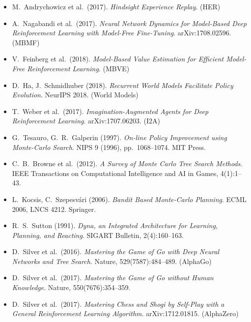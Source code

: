 \documentclass[11pt,a4paper]{article}
\theoremstyle{definition}
\theoremstyle{plain}
\theoremstyle{remark}
\begin{document}
\begin{itemize}
    \item M.\ Andrychowicz et al.\ (2017). \emph{Hindsight Experience Replay}. (HER)
    \item A.\ Nagabandi et al.\ (2017). \emph{Neural Network Dynamics for Model-Based Deep Reinforcement Learning with Model-Free Fine-Tuning}. arXiv:1708.02596. (MBMF)
    \item V.\ Feinberg et al.\ (2018). \emph{Model-Based Value Estimation for Efficient Model-Free Reinforcement Learning}. (MBVE)
    \item D.\ Ha, J.\ Schmidhuber (2018). \emph{Recurrent World Models Facilitate Policy Evolution}. NeurIPS 2018. (World Models)
    \item T.\ Weber et al.\ (2017). \emph{Imagination-Augmented Agents for Deep Reinforcement Learning}. arXiv:1707.06203. (I2A)
    \item G.\ Tesauro, G.\ R.\ Galperin (1997). \emph{On-line Policy Improvement using Monte-Carlo Search}. NIPS 9 (1996), pp.\ 1068--1074. MIT Press.
    \item C.\ B.\ Browne et al.\ (2012). \emph{A Survey of Monte Carlo Tree Search Methods}. IEEE Transactions on Computational Intelligence and AI in Games, 4(1):1--43.
    \item L.\ Kocsis, C.\ Szepesv\'ari (2006). \emph{Bandit Based Monte-Carlo Planning}. ECML 2006, LNCS 4212. Springer.
    \item R.\ S.\ Sutton (1991). \emph{Dyna, an Integrated Architecture for Learning, Planning, and Reacting}. SIGART Bulletin, 2(4):160--163.
    \item D.\ Silver et al.\ (2016). \emph{Mastering the Game of Go with Deep Neural Networks and Tree Search}. Nature, 529(7587):484--489. (AlphaGo)
    \item D.\ Silver et al.\ (2017). \emph{Mastering the Game of Go without Human Knowledge}. Nature, 550(7676):354--359.
    \item D.\ Silver et al.\ (2017). \emph{Mastering Chess and Shogi by Self-Play with a General Reinforcement Learning Algorithm}. arXiv:1712.01815. (AlphaZero)
\end{itemize}
\end{document}
